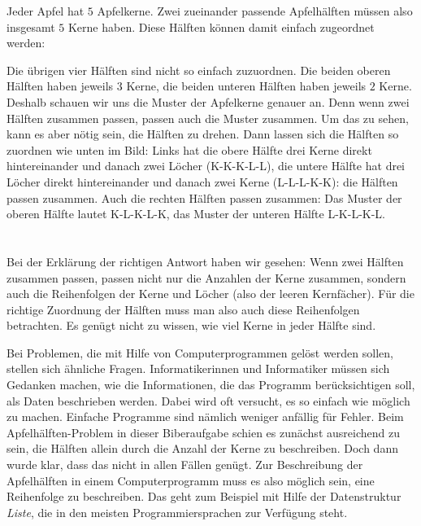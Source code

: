 {{{\centering%
\par}

Jeder Apfel hat $5$ Apfelkerne. Zwei zueinander passende Apfelhälften müssen also insgesamt $5$ Kerne haben. Diese Hälften können damit einfach zugeordnet werden:

{\centering%
\par}

Die übrigen vier Hälften sind nicht so einfach zuzuordnen. Die beiden oberen Hälften haben jeweils $3$ Kerne, die beiden unteren Hälften haben jeweils $2$ Kerne.  Deshalb schauen wir uns die Muster der Apfelkerne genauer an.  Denn wenn zwei Hälften zusammen passen, passen auch die Muster zusammen.  Um das zu sehen, kann es aber nötig sein, die Hälften zu drehen.  Dann lassen sich die Hälften so zuordnen wie unten im Bild:  Links hat die obere Hälfte drei Kerne direkt hintereinander und danach zwei Löcher (K-K-K-L-L), die untere Hälfte hat drei Löcher direkt hintereinander und danach zwei Kerne (L-L-L-K-K): die Hälften passen zusammen.  Auch die rechten Hälften passen zusammen:  Das Muster der oberen Hälfte lautet K-L-K-L-K, das Muster der unteren Hälfte L-K-L-K-L.

{\centering%
\par}



\section*{\BrochureItsInformatics}
Bei der Erklärung der richtigen Antwort haben wir gesehen:  Wenn zwei Hälften zusammen passen, passen nicht nur die Anzahlen der Kerne zusammen, sondern auch die Reihenfolgen der Kerne und Löcher (also der leeren Kernfächer).  Für die richtige Zuordnung der Hälften muss man also auch diese Reihenfolgen betrachten.  Es genügt nicht zu wissen, wie viel Kerne in jeder Hälfte sind.

Bei Problemen, die mit Hilfe von Computerprogrammen gelöst werden sollen, stellen sich ähnliche Fragen. Informatikerinnen und Informatiker müssen sich Gedanken machen, wie die Informationen, die das Programm berücksichtigen soll, als Daten beschrieben werden.  Dabei wird oft versucht, es so einfach wie möglich zu machen.  Einfache Programme sind nämlich weniger anfällig für Fehler.  Beim Apfelhälften-Problem in dieser Biberaufgabe schien es zunächst ausreichend zu sein, die Hälften allein durch die Anzahl der Kerne zu beschreiben.  Doch dann wurde klar, dass das nicht in allen Fällen genügt.  Zur Beschreibung der Apfelhälften in einem Computerprogramm muss es also möglich sein, eine Reihenfolge zu beschreiben.  Das geht zum Beispiel mit Hilfe der Datenstruktur \emph{Liste}, die in den meisten Programmiersprachen zur Verfügung steht.



}}
